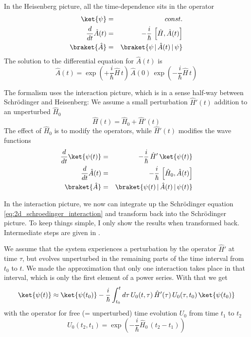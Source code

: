 In the Heisenberg picture, all the time-dependence sits in the operator
\begin{eqnarray}
 \ket{\psi} &=& const. \\
 \frac{d}{dt} \hat{A}(t) &=& - \frac{i}{\hbar} \, \left[ \hat{H} , \hat{A}(t) \right] \\
 \braket{\hat{A}} &=& \braket{\psi \, | \,\hat{A} (t) \, |\, \psi } 
\end{eqnarray}
The solution to the differential equation for  $\hat{A}(t)$ is
\begin{equation}
 \hat{A}(t) = \exp \left(+ \frac{i}{\hbar} \hat{H} \, t \right) \, \hat{A}(0) \, \exp \left(- \frac{i}{\hbar} \hat{H} \, t \right)
\end{equation}


The formalism uses the  interaction picture, which is in a sense half-way between Schrödinger and Heisenberg: We assume a small perturbation $\hat{H}'(t)$ addition to an unperturbed $\hat{H}_0$
\begin{equation}
 \hat{H}(t) = \hat{H}_0 + \hat{H}'(t) \label{eq:2d_hamilton_perturbation}
\end{equation}
The effect of  $\hat{H}_0$ is to modify the operators, while $\hat{H}'(t)$ modifies the wave functions
\begin{eqnarray}
  \frac{d}{dt} \ket{\psi(t)} &=& - \frac{i}{\hbar} \, \hat{H}' \, \ket{\psi(t)}  \label{eq:2d_schroedinger_interaction}\\
 \frac{d}{dt} \hat{A}(t) &=& - \frac{i}{\hbar} \, \left[ \hat{H}_0 , \hat{A}(t) \right] \\
 \braket{\hat{A}} &=& \braket{\psi(t) \, | \,\hat{A} (t) \, |\, \psi(t) } 
\end{eqnarray}


In the interaction picture, we now can integrate up  the Schrödinger equation \ref{eq:2d_schroedinger_interaction} and transform  back into the Schrödinger picture. To keep things simple, I only show the results when transformed back. Intermediate steps are given in \cite{Hamm-dummies}.


We assume  that the system experiences a perturbation by the operator $\hat{H}'$ at time $\tau$, but evolves unperturbed in the remaining parts of the time interval from $t_0$ to $t$. We made the approximation that only one interaction takes place in that interval, which is only the first element of a power series. With that we get
\begin{equation}
\ket{\psi(t)}  
  \approx  \ket{\psi(t_0)} - \frac{i}{\hbar} \int_{t_0}^t d \tau \,  U_0( t , \tau) \,\hat{H}'(\tau) \,  U_0 (\tau , t_0) \, \ket{\psi(t_0)}  \label{eq:2d_time_evol}
\end{equation}
with the operator for free (= unperturbed) time evolution $U_0$ from time $t_1$ to $t_2$
\begin{equation}
 U_0(t_2, t_1) = \exp \left(- \frac{i}{\hbar} \hat{H}_0 \, ( t_2- t_1) \right)
\end{equation}


